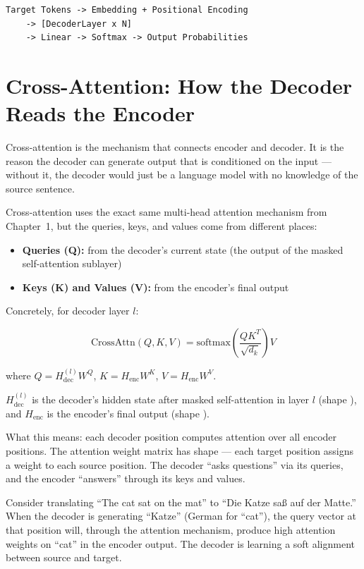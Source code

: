 \begin{verbatim}
Target Tokens -> Embedding + Positional Encoding
    -> [DecoderLayer x N]
    -> Linear -> Softmax -> Output Probabilities
\end{verbatim}

\section{Cross-Attention: How the Decoder Reads the Encoder}

Cross-attention is the mechanism that connects encoder and decoder. It is the reason the decoder can generate output that is conditioned on the input --- without it, the decoder would just be a language model with no knowledge of the source sentence.

Cross-attention uses the exact same multi-head attention mechanism from Chapter~1, but the queries, keys, and values come from different places:

\begin{itemize}
  \item \textbf{Queries (Q):} from the decoder's current state (the output of the masked self-attention sublayer)
  \item \textbf{Keys (K) and Values (V):} from the encoder's final output
\end{itemize}

Concretely, for decoder layer $l$:

\[\text{CrossAttn}(Q, K, V) = \text{softmax}\left(\frac{Q K^T}{\sqrt{d_k}}\right) V\]

where $Q = H_{\text{dec}}^{(l)} W^Q$, $K = H_{\text{enc}} W^K$, $V = H_{\text{enc}} W^V$.

$H_{\text{dec}}^{(l)}$ is the decoder's hidden state after masked self-attention in layer $l$ (shape ), and $H_{\text{enc}}$ is the encoder's final output (shape ).

What this means: each decoder position computes attention over all encoder positions. The attention weight matrix has shape  --- each target position assigns a weight to each source position. The decoder ``asks questions'' via its queries, and the encoder ``answers'' through its keys and values.

Consider translating ``The cat sat on the mat'' to ``Die Katze sa\ss{} auf der Matte.'' When the decoder is generating ``Katze'' (German for ``cat''), the query vector at that position will, through the attention mechanism, produce high attention weights on ``cat'' in the encoder output. The decoder is learning a soft alignment between source and target.

